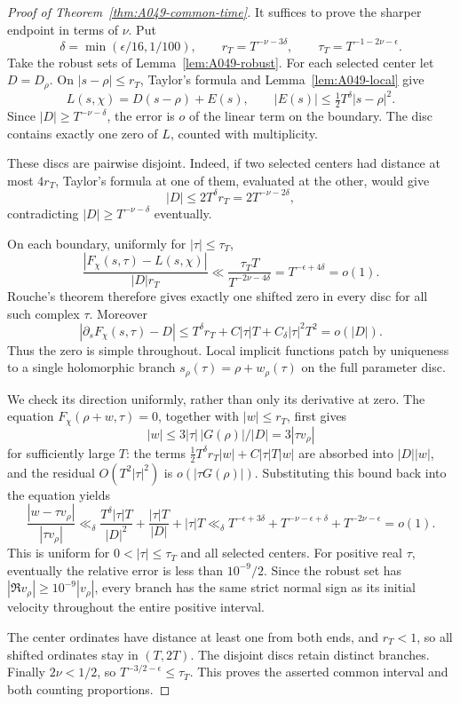 \begin{proof}[Proof of Theorem~\ref{thm:A049-common-time}]
It suffices to prove the sharper endpoint in terms of
\(\nu\). Put
\[
 \delta=\min(\epsilon/16,1/100),\qquad
 r_T=T^{-\nu-3\delta},\qquad
 \tau_T=T^{-1-2\nu-\epsilon}.
\]
Take the robust sets of Lemma~\ref{lem:A049-robust}.
For each selected center let \(D=D_\rho\). On
\(|s-\rho|\le r_T\), Taylor's formula and
Lemma~\ref{lem:A049-local} give
\[
 L(s,\chi)=D(s-\rho)+E(s),\qquad
 |E(s)|\le\tfrac12 T^\delta|s-\rho|^2.
\]
Since \(|D|\ge T^{-\nu-\delta}\), the error is \(o\) of
the linear term on the boundary. The disc contains exactly
one zero of \(L\), counted with multiplicity.

These discs are pairwise disjoint. Indeed, if two selected
centers had distance at most \(4r_T\), Taylor's formula at
one of them, evaluated at the other, would give
\[
 |D|\le2T^\delta r_T=2T^{-\nu-2\delta},
\]
contradicting \(|D|\ge T^{-\nu-\delta}\) eventually.

On each boundary, uniformly for \(|\tau|\le\tau_T\),
\[
 \frac{|F_\chi(s,\tau)-L(s,\chi)|}{|D|r_T}
 \ll \frac{\tau_T T}{T^{-2\nu-4\delta}}
                         =T^{-\epsilon+4\delta}=o(1).
\]
Rouche's theorem therefore gives exactly one shifted zero
in every disc for all such complex \(\tau\). Moreover
\[
 |\partial_sF_\chi(s,\tau)-D|
 \le T^\delta r_T+C|\tau|T+C_\delta|\tau|^2T^2=o(|D|).
\]
Thus the zero is simple throughout. Local implicit functions
patch by uniqueness to a single holomorphic branch
\(s_\rho(\tau)=\rho+w_\rho(\tau)\) on the full parameter disc.

We check its direction uniformly, rather than only its
derivative at zero. The equation
\(F_\chi(\rho+w,\tau)=0\), together with
\(|w|\le r_T\), first gives
\[
 |w|\le3|\tau|\,|G(\rho)|/|D|
                          =3|\tau v_\rho|
\]
for sufficiently large \(T\): the terms
\(\tfrac12T^\delta r_T|w|+C|\tau|T|w|\) are absorbed
into \(|D||w|\), and the residual
\(O(T^2|\tau|^2)\) is \(o(|\tau G(\rho)|)\).
Substituting this bound back into the equation yields
\[
 \frac{|w-\tau v_\rho|}{|\tau v_\rho|}
 \ll_\delta
      \frac{T^\delta|\tau|T}{|D|^2}
        +\frac{|\tau|T}{|D|}+|\tau|T
 \ll_\delta
      T^{-\epsilon+3\delta}
       +T^{-\nu-\epsilon+\delta}
       +T^{-2\nu-\epsilon}=o(1).
\]
This is uniform for \(0<|\tau|\le\tau_T\) and all selected
centers. For positive real \(\tau\), eventually the relative
error is less than \(10^{-9}/2\). Since the robust set has
\(|\Re v_\rho|\ge10^{-9}|v_\rho|\), every branch has the
same strict normal sign as its initial velocity throughout
the entire positive interval.

The center ordinates have distance at least one from both
ends, and \(r_T<1\), so all shifted ordinates stay in
\((T,2T)\). The disjoint discs retain distinct branches.
Finally \(2\nu<1/2\), so
\(T^{-3/2-\epsilon}\le\tau_T\). This proves the asserted
common interval and both counting proportions.
\end{proof}

